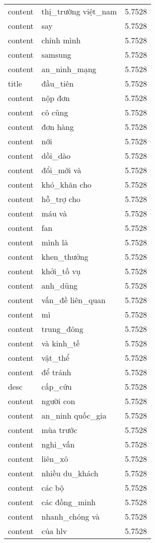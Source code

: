 \documentclass{article}
\begin{document}
\begin{tabular}{lll}
content & thị\_trường việt\_nam & 5.7528\\
content & say & 5.7528\\
content & chính mình & 5.7528\\
content & samsung & 5.7528\\
content & an\_ninh\_mạng & 5.7528\\
title & đầu\_tiên & 5.7528\\
content & nộp đơn & 5.7528\\
content & cô cũng & 5.7528\\
content & đơn hàng & 5.7528\\
content & nới & 5.7528\\
content & dồi\_dào & 5.7528\\
content & đổi\_mới và & 5.7528\\
content & khó\_khăn cho & 5.7528\\
content & hỗ\_trợ cho & 5.7528\\
content & máu và & 5.7528\\
content & fan & 5.7528\\
content & mình là & 5.7528\\
content & khen\_thưởng & 5.7528\\
content & khởi\_tố vụ & 5.7528\\
content & anh\_dũng & 5.7528\\
content & vấn\_đề liên\_quan & 5.7528\\
content & mì & 5.7528\\
content & trung\_đông & 5.7528\\
content & và kinh\_tế & 5.7528\\
content & vật\_thể & 5.7528\\
content & để tránh & 5.7528\\
desc & cấp\_cứu & 5.7528\\
content & người con & 5.7528\\
content & an\_ninh quốc\_gia & 5.7528\\
content & mùa trước & 5.7528\\
content & nghi\_vấn & 5.7528\\
content & liên\_xô & 5.7528\\
content & nhiều du\_khách & 5.7528\\
content & các bộ & 5.7528\\
content & các đồng\_minh & 5.7528\\
content & nhanh\_chóng và & 5.7528\\
content & của hlv & 5.7528\\

\end{tabular}
\end{document}
